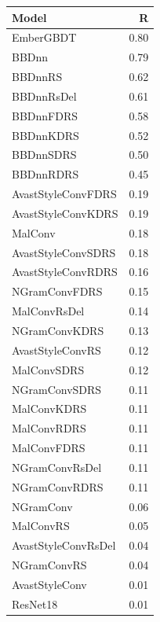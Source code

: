 \begin{tabular}{lr}
\toprule
Model & R \\
\midrule
EmberGBDT & 0.80 \\
BBDnn & 0.79 \\
BBDnnRS & 0.62 \\
BBDnnRsDel & 0.61 \\
BBDnnFDRS & 0.58 \\
BBDnnKDRS & 0.52 \\
BBDnnSDRS & 0.50 \\
BBDnnRDRS & 0.45 \\
AvastStyleConvFDRS & 0.19 \\
AvastStyleConvKDRS & 0.19 \\
MalConv & 0.18 \\
AvastStyleConvSDRS & 0.18 \\
AvastStyleConvRDRS & 0.16 \\
NGramConvFDRS & 0.15 \\
MalConvRsDel & 0.14 \\
NGramConvKDRS & 0.13 \\
AvastStyleConvRS & 0.12 \\
MalConvSDRS & 0.12 \\
NGramConvSDRS & 0.11 \\
MalConvKDRS & 0.11 \\
MalConvRDRS & 0.11 \\
MalConvFDRS & 0.11 \\
NGramConvRsDel & 0.11 \\
NGramConvRDRS & 0.11 \\
NGramConv & 0.06 \\
MalConvRS & 0.05 \\
AvastStyleConvRsDel & 0.04 \\
NGramConvRS & 0.04 \\
AvastStyleConv & 0.01 \\
ResNet18 & 0.01 \\
\bottomrule
\end{tabular}
